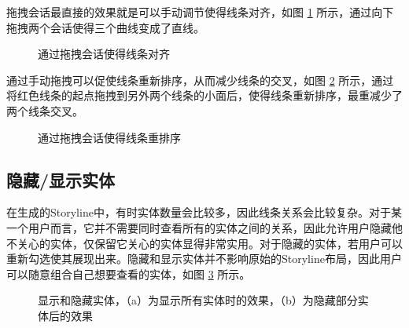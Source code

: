 拖拽会话最直接的效果就是可以手动调节使得线条对齐，如图 \ref{fig:drag-to-realignment} 所示，通过向下拖拽两个会话使得三个曲线变成了直线。
\begin{figure}[htb]
    \centering
    \caption{通过拖拽会话使得线条对齐}
    \label{fig:drag-to-realignment}
\end{figure}

通过手动拖拽可以促使线条重新排序，从而减少线条的交叉，如图 \ref{fig:drag-to-reorder} 所示，通过将红色线条的起点拖拽到另外两个线条的小面后，使得线条重新排序，最重减少了两个线条交叉。
\begin{figure}[htb]
    \centering
    \caption{通过拖拽会话使得线条重排序}
    \label{fig:drag-to-reorder}
\end{figure}

\subsection{隐藏/显示实体}
在生成的Storyline中，有时实体数量会比较多，因此线条关系会比较复杂。对于某一个用户而言，它并不需要同时查看所有的实体之间的关系，因此允许用户隐藏他不关心的实体，仅保留它关心的实体显得非常实用。对于隐藏的实体，若用户可以重新勾选使其展现出来。隐藏和显示实体并不影响原始的Storyline布局，因此用户可以随意组合自己想要查看的实体，如图 \ref{fig:hide-character} 所示。
\begin{figure}[htb]
    \centering

    \caption{显示和隐藏实体，（a）为显示所有实体时的效果，（b）为隐藏部分实体后的效果}
    \label{fig:hide-character}
\end{figure}

